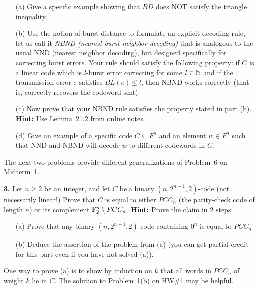 \documentclass[12pt]{amsart}
\begin{document}
\begin{itemize}
\item[(a)] Give a specific example showing that $BD$ does NOT satisfy the triangle inequality.
\item[(b)] Use the notion of burst distance to formulate an explicit decoding rule, let us call it {\it NBND (nearest burst neighbor decoding)} that is analogous to the usual NND (nearest neighbor decoding), but designed specifically for correcting burst errors. Your rule should satisfy the following property: if $C$ is a linear code which is $l$-burst error correcting for some $l\in{\mathbb N}$ and if the transmission error $e$ satisfies
$BL(e)\leq l$, then NBND works correctly (that is, correctly recovers the codeword sent).
\item[(c)] Now prove that your NBND rule satisfies the property stated in part (b). {\bf Hint:} Use Lemma~21.2 from online notes.
\item[(d)] Give an example of a specific code $C\subseteq F^n$ and an element $w\in F^n$ such that NND and NBND will decode $w$
to different codewords in $C$.
\end{itemize}

The next two problems provide different generalizations of Problem~6 on Midterm~1.
\skv

{\bf 3.} Let $n\geq 2$ be an integer, and let $C$ be a binary $(n,2^{n-1},2)$-code (not necessarily linear!) Prove that
$C$ is equal to either $PCC_n$ (the parity-check code of length $n$) or its complement ${\mathbb F}_2^n\setminus PCC_n$.
\skv
{\bf Hint:} Prove the claim in 2 steps:
\begin{itemize}
\item[(a)] Prove that any binary $(n,2^{n-1},2)$-code containing $0^n$ is equal to $PCC_n$
\item[(b)] Deduce the assertion of the problem from (a) (you can get partial credit for this part even if you have not solved (a)).
\end{itemize}
One way to prove (a) is to show by induction on $k$ that all words in $PCC_n$ of weight $k$ lie in $C$. The solution to Problem~1(b)
on HW\#1 may be helpful. 
\skv
\end{document}
